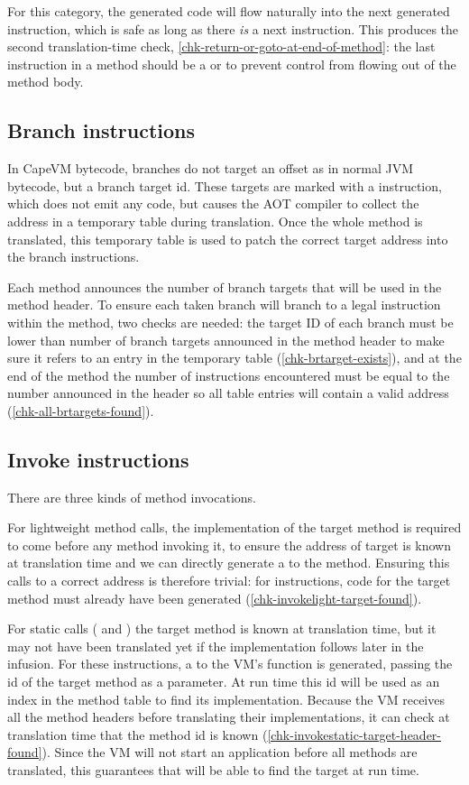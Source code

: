 For this category, the generated code will flow naturally into the next generated instruction, which is safe as long as there \emph{is} a next instruction. This produces the second translation-time check, \ref{chk-return-or-goto-at-end-of-method}: the last instruction in a method should be a  or  to prevent control from flowing out of the method body.

\subsection{Branch instructions}
In CapeVM bytecode, branches do not target an offset as in normal JVM bytecode, but a branch target id. These targets are marked with a  instruction, which does not emit any code, but causes the AOT compiler to collect the address in a temporary table during translation. Once the whole method is translated, this temporary table is used to patch the correct target address into the branch instructions.

Each method announces the number of branch targets that will be used in the method header. To ensure each taken branch will branch to a legal instruction within the method, two checks are needed: the target ID of each branch must be lower than number of branch targets announced in the method header to make sure it refers to an entry in the temporary table (\ref{chk-brtarget-exists}), and at the end of the method the number of  instructions encountered must be equal to the number announced in the header so all table entries will contain a valid address (\ref{chk-all-brtargets-found}).

\subsection{Invoke instructions}
There are three kinds of method invocations.

For lightweight method calls, the implementation of the target method is required to come before any method invoking it, to ensure the address of target is known at translation time and we can directly generate a  to the method. Ensuring this calls to a correct address is therefore trivial: for  instructions, code for the target method must already have been generated (\ref{chk-invokelight-target-found}).

For static calls ( and ) the target method is known at translation time, but it may not have been translated yet if the implementation follows later in the infusion. For these instructions, a  to the VM's  function is generated, passing the id of the target method as a parameter. At run time this id will be used as an index in the method table to find its implementation. Because the VM receives all the method headers before translating their implementations, it can check at translation time that the method id is known (\ref{chk-invokestatic-target-header-found}). Since the VM will not start an application before all methods are translated, this guarantees that  will be able to find the target at run time.

